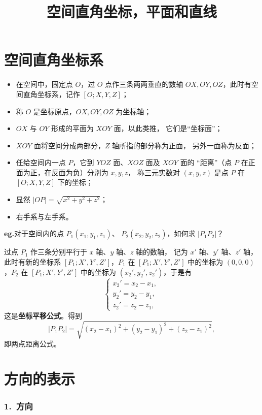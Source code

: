 \documentclass[UTF8,11pt]{ctexart}
\title{空间直角坐标，平面和直线}
\date{}
\theoremstyle{cnthm}
\begin{document}
\maketitle

\section{空间直角坐标系}

\begin{itemize}
\item 在空间中，固定点 $O$，过 $O$ 点作三条两两垂直的数轴
$OX,OY,OZ$，此时有空间直角坐标系，记作 $[O;X,Y,Z]$；
\item 称 $O$ 是坐标原点，$OX,OY,OZ$ 为坐标轴；
\item $OX$ 与 $OY$ 形成的平面为 $XOY$ 面，以此类推，
它们是“坐标面”；
\item $XOY$ 面将空间分成两部分，$Z$ 轴所指的部分称为正面，
另外一面称为反面；
\item 任给空间内一点 $P$，它到 $YOZ$ 面、$XOZ$ 面及 $XOY$ 面的
“距离”（点 $P$ 在正面为正，在反面为负）分别为 $x,y,z$，
称三元实数对 $(x,y,z)$ 是点 $P$ 在 $[O;X,Y,Z]$ 下的坐标；
\item 显然 $|OP|=\sqrt{x^2+y^2+z^2}$；
\item 右手系与左手系。
\end{itemize}

\textbf{eg.}\quad 对于空间内的点 $P_1(x_1,y_1,z_1)$、
$P_2(x_2,y_2,z_2)$，如何求 $|P_1P_2|$？

过点 $P_1$ 作三条分别平行于 $x$ 轴、$y$ 轴、$z$ 轴的数轴，
记为 $x'$ 轴、$y'$ 轴、$z'$ 轴，此时有新的坐标系
$[P_1;X',Y',Z']$，$P_1$ 在 $[P_1;X',Y',Z']$ 中的坐标为
$(0,0,0)$，$P_2$ 在 $[P_1;X',Y',Z']$ 中的坐标为
$(x_2',y_2',z_2')$，于是有
\[
\begin{cases}
x_2'=x_2-x_1,\\
y_2'=y_2-y_1,\\
z_2'=z_2-z_1,
\end{cases}
\]
这是\textbf{坐标平移公式}。得到
\[
|P_1P_2|=\sqrt{(x_2-x_1)^2+(y_2-y_1)^2+(z_2-z_1)^2},
\]
即两点距离公式。

\section{方向的表示}

\subsubsection*{1.\ 方向}
\end{document}
